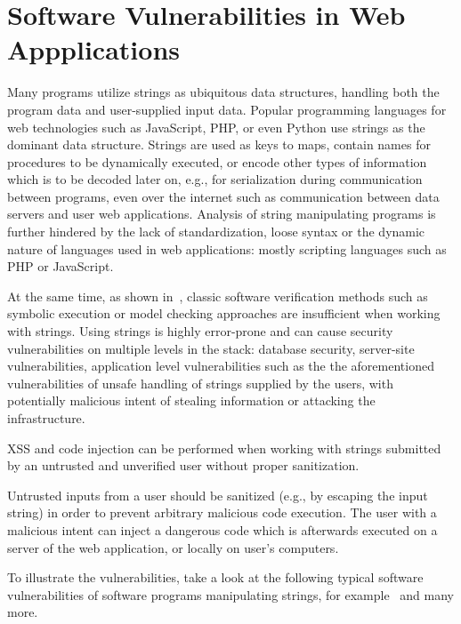 
\section{Software Vulnerabilities in Web Appplications}

Many programs utilize strings as ubiquitous data structures, handling both the program data and user-supplied input data.
Popular programming languages for web technologies such as JavaScript, PHP, or even Python use strings as the dominant data structure. Strings are used as keys to maps, contain names for procedures to be dynamically executed, or encode other types of information which is to be decoded later on, e.g., for serialization during communication between programs, even over the internet such as communication between data servers and user web applications.
Analysis of string manipulating programs is further hindered by the lack of standardization, loose syntax or the dynamic nature of languages used in web applications: mostly scripting languages such as PHP or JavaScript.

At the same time, as shown in~\cite{analjschallenges17}, classic software verification methods such as symbolic execution or model checking approaches are insufficient when working with strings.
Using strings is highly error-prone and can cause security vulnerabilities on multiple levels in the stack: database security, server-site vulnerabilities, application level vulnerabilities such as the the aforementioned vulnerabilities of unsafe handling of strings supplied by the users, with potentially malicious intent of stealing information or attacking the infrastructure.

XSS and code injection can be performed when working with strings submitted by an untrusted and unverified user without proper sanitization.

Untrusted inputs from a user should be sanitized (e.g., by escaping the input string) in order to prevent arbitrary malicious code execution.
The user with a malicious intent can inject a dangerous code which is afterwards executed on a server of the web application, or locally on user's computers.

To illustrate the vulnerabilities, take a look at the following typical software vulnerabilities of software programs manipulating strings, for example~\cite{replace_nfts_model_ModelingRegularReplacementForStringConstraintSolving_DBLP:conf/nfm/FuL10,kern14} and many more.

